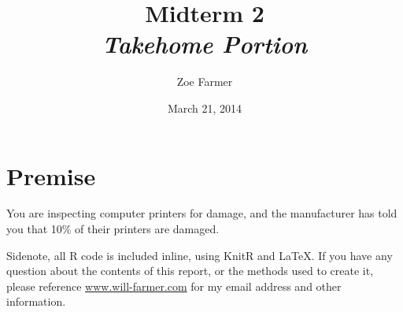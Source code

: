 \documentclass[10pt]{report}\usepackage[]{graphicx}\usepackage[]{xcolor}
\title{Midterm 2\\\textit{Takehome Portion}}
\author{Zoe Farmer}
\date{March 21, 2014}
\begin{document}
\maketitle

\section{Premise}
You are inspecting computer printers for damage, and the manufacturer has told you that 10\% of their printers are
damaged.\newline

Sidenote, all {\ttfamily R} code is included inline, using KnitR and \LaTeX. If you have any question about the contents
of this report, or the methods used to create it, please reference \url{www.will-farmer.com} for my email address and
other information.
\end{document}
